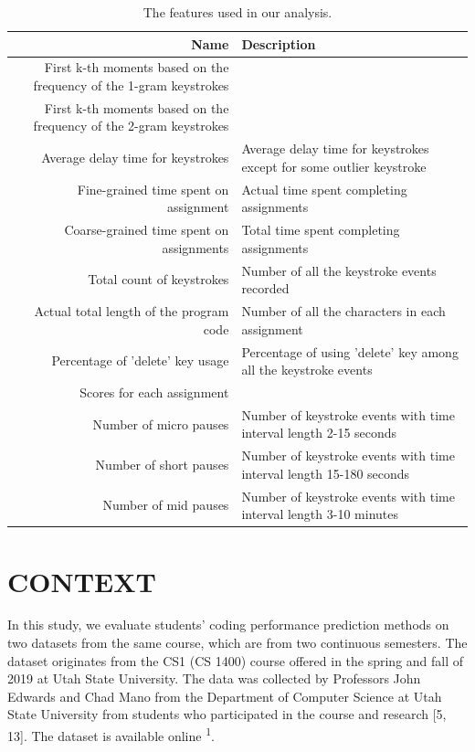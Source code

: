 \documentclass[sigconf,final]{acmart}
\begin{document}
\begin{table}[h]
\centering
\caption{The features used in our analysis.}
\begin{tabular}{r|l} %
\toprule
Name & Description\\ \hline
First k-th moments based on the frequency of the 1-gram keystrokes & 
\\
First k-th moments based on the frequency of the 2-gram keystrokes & 
\\
Average delay time for keystrokes & Average delay time for keystrokes except for some outlier keystroke \\
Fine-grained time spent on assignment & Actual time spent completing assignments \\
Coarse-grained time spent on assignments & Total time spent completing assignments \\
Total count of keystrokes & Number of all the keystroke events recorded \\
Actual total length of the program code & Number of all the characters in each assignment \\
Percentage of 'delete' key usage & Percentage of using 'delete' key among all the keystroke events \\
Scores for each assignment&  \\
Number of micro pauses & Number of keystroke events with time interval length 2-15 seconds\\
Number of short pauses & Number of keystroke events with time interval length 15-180 seconds \\
Number of mid pauses & Number of keystroke events with time interval length 3-10 minutes \\

\bottomrule
\end{tabular}
\end{table}

\section{CONTEXT}
In this study, we evaluate students’ coding performance prediction methods on two datasets from the same course, which are from two continuous semesters.
The dataset originates from the CS1 (CS 1400) course offered in the spring and fall of 2019 at Utah State University. The data was collected by Professors John Edwards and Chad Mano from the Department of Computer Science at Utah State University from students who participated in the course and research [5, 13]. The dataset is available online \textsuperscript{1}.
\end{document}
